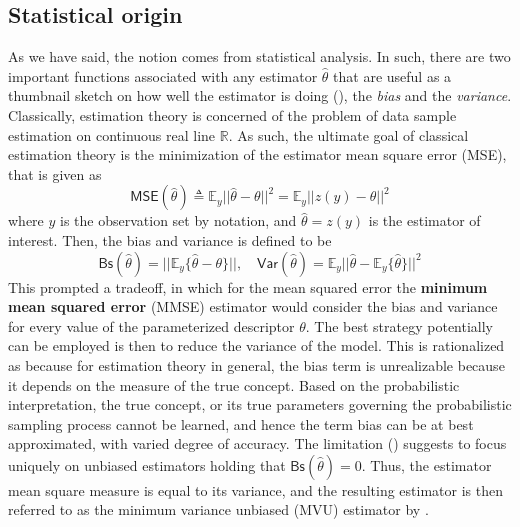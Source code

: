 \documentclass[10pt,oneside,oldfontcommands,dvipsnames,article]{memoir}
\begin{document}
\subsection{Statistical origin}
As we have said, the notion comes from statistical analysis. In such, there are two important functions associated with any estimator $\hat{\theta}$ that are useful as a thumbnail sketch on how well the estimator is doing (\cite{liam_statistics_2005}), the \textit{bias} and the \textit{variance}. Classically, estimation theory is concerned of the problem of data sample estimation on continuous real line $\mathbb{R}$. As such, the ultimate goal of classical estimation theory is the minimization of the estimator mean square error (MSE), that is given as 
\begin{equation}
  \mathsf{MSE}(\hat{\theta}) \triangleq \mathbb{E}_{y} \lvert \lvert \hat{\theta} - \theta \rvert \rvert^{2} = \mathbb{E}_{y} \lvert\lvert z(y) - \theta \rvert \rvert^{2}
\end{equation}
where $y$ is the observation set by notation, and $\hat{\theta}=z(y)$ is the estimator of interest. Then, the bias and variance is defined to be
\begin{equation}
  \mathsf{Bs}(\hat{\theta}) = \lvert\lvert \mathbb{E}_{y} \{\hat{\theta} - \theta\}\rvert\rvert, \quad \mathsf{Var}(\hat{\theta}) = \mathbb{E}_{y} \lvert\lvert \hat{\theta} - \mathbb{E}_{y} \{\hat{\theta}\}\vert\rvert^{2}
\end{equation}
This prompted a tradeoff, in which for the mean squared error the \textbf{minimum mean squared error} (MMSE) estimator would consider the bias and variance for every value of the parameterized descriptor $\theta$. The best strategy potentially can be employed is then to reduce the variance of the model. This is rationalized as because for estimation theory in general, the bias term is unrealizable because it depends on the measure of the true concept. Based on the probabilistic interpretation, the true concept, or its true parameters governing the probabilistic sampling process cannot be learned, and hence the term bias can be at best approximated, with varied degree of accuracy. The limitation (\cite{piera_sample_2005,MkayPretenceSignalStatistics1993}) suggests to focus uniquely on unbiased estimators holding that $\mathsf{Bs}(\hat{\theta})=0$. Thus, the estimator mean square measure is equal to its variance, and the resulting estimator is then referred to as the minimum variance unbiased (MVU) estimator by \cite{MkayPretenceSignalStatistics1993}. 
\end{document}
